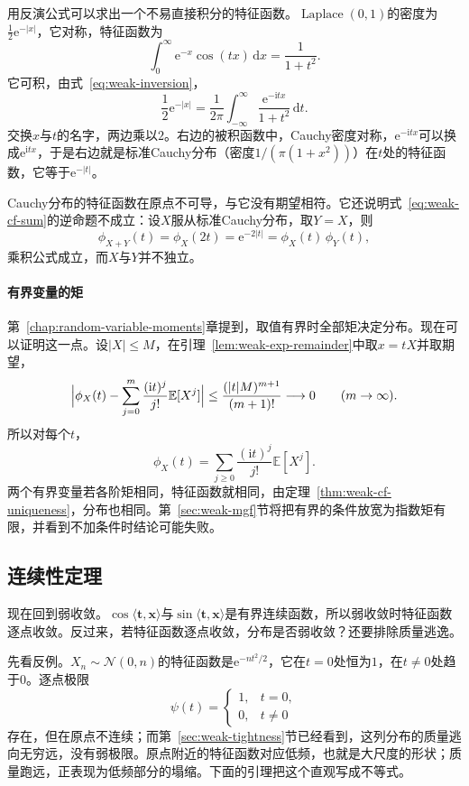 用反演公式可以求出一个不易直接积分的特征函数。$\operatorname{Laplace}(0,1)$的密度为$\frac12\mathrm{e}^{-\lvert x\rvert}$，它对称，特征函数为
\[
 \int_0^{\infty}\mathrm{e}^{-x}\cos(tx)\,\mathrm{d}x=\frac{1}{1+t^{2}} .
\]
它可积，由式~\eqref{eq:weak-inversion}，
\[
 \frac12\mathrm{e}^{-\lvert x\rvert}=\frac{1}{2\pi}\int_{-\infty}^{\infty}\frac{\mathrm{e}^{-\mathrm{i}tx}}{1+t^{2}}\,\mathrm{d}t .
\]
交换$x$与$t$的名字，两边乘以$2$。右边的被积函数中，Cauchy密度对称，$\mathrm{e}^{-\mathrm{i}tx}$可以换成$\mathrm{e}^{\mathrm{i}tx}$，于是右边就是标准Cauchy分布（密度$1/(\pi(1+x^{2}))$）在$t$处的特征函数，它等于$\mathrm{e}^{-\lvert t\rvert}$。

Cauchy分布的特征函数在原点不可导，与它没有期望相符。它还说明式~\eqref{eq:weak-cf-sum}的逆命题不成立：设$X$服从标准Cauchy分布，取$Y=X$，则
\[
 \phi_{X+Y}(t)=\phi_X(2t)=\mathrm{e}^{-2\lvert t\rvert}=\phi_X(t)\,\phi_Y(t) ,
\]
乘积公式成立，而$X$与$Y$并不独立。

\paragraph{有界变量的矩}
第~\ref{chap:random-variable-moments}章提到，取值有界时全部矩决定分布。现在可以证明这一点。设$\lvert X\rvert\leq M$，在引理~\ref{lem:weak-exp-remainder}中取$x=tX$并取期望，
\[
 \Bigl\lvert\phi_X(t)-\sum_{j=0}^{m}\frac{(\mathrm{i}t)^{j}}{j!}\mathbb{E}[X^{j}]\Bigr\rvert\leq\frac{(\lvert t\rvert M)^{m+1}}{(m+1)!}\longrightarrow0\qquad(m\to\infty) .
\]
所以对每个$t$，
\[
 \phi_X(t)=\sum_{j\geq0}\frac{(\mathrm{i}t)^{j}}{j!}\mathbb{E}[X^{j}] .
\]
两个有界变量若各阶矩相同，特征函数就相同，由定理~\ref{thm:weak-cf-uniqueness}，分布也相同。第~\ref{sec:weak-mgf}节将把有界的条件放宽为指数矩有限，并看到不加条件时结论可能失败。

\subsection{连续性定理}
\label{sec:weak-cf-continuity}

现在回到弱收敛。$\cos\langle\bm{t},\bm{x}\rangle$与$\sin\langle\bm{t},\bm{x}\rangle$是有界连续函数，所以弱收敛时特征函数逐点收敛。反过来，若特征函数逐点收敛，分布是否弱收敛？还要排除质量逃逸。

先看反例。$X_n\sim\mathcal{N}(0,n)$的特征函数是$\mathrm{e}^{-nt^{2}/2}$，它在$t=0$处恒为$1$，在$t\neq0$处趋于$0$。逐点极限
\[
 \psi(t)=\begin{cases}1,&t=0,\\0,&t\neq0\end{cases}
\]
存在，但在原点不连续；而第~\ref{sec:weak-tightness}节已经看到，这列分布的质量逃向无穷远，没有弱极限。原点附近的特征函数对应低频，也就是大尺度的形状；质量跑远，正表现为低频部分的塌缩。下面的引理把这个直观写成不等式。

